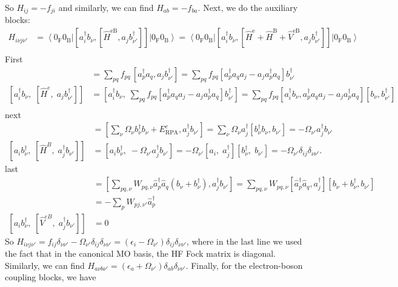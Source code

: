 So $H_{ij} = -f_{ji}$ and similarly, we can find $H_{ab} = -f_{ba}$. Next, we do the auxiliary blocks:
\begin{align}
H_{i \nu j \nu'} &= \left\langle 0_{\mathrm{F}} 0_{\mathrm{B}}\right|\left[a_i^{\dagger} b_\nu, \left[\hat{H}^{\mathrm{eB}}, a_j b_{\nu'}^{\dagger}\right]\right]\left|0_{\mathrm{F}} 0_{\mathrm{B}}\right\rangle = \left\langle 0_{\mathrm{F}} 0_{\mathrm{B}}\right|\left[a_i^{\dagger} b_\nu, \left[\hat{H}^{\mathrm{e}} + \hat{H}^{\mathrm{B}} + \hat{V}^{\mathrm{eB}}, a_j b_{\nu'}^{\dagger}\right]\right]\left|0_{\mathrm{F}} 0_{\mathrm{B}}\right\rangle \\
\end{align}
First
\begin{align}
[\hat H^e,\;a_j b_{\nu'}^{\dagger}] &= \sum_{p q}f_{pq}\,[a_p^\dagger a_q, a_j b_{\nu'}^{\dagger}] = \sum_{pq}f_{pq} [a_p^\dagger a_q a_j - a_j a_p^\dagger a_q] b_{\nu'}^{\dagger} \\
[a_i^\dagger b_\nu,\;[\hat H^e,\;a_j b_{\nu'}^{\dagger}]] &= [a_i^\dagger b_\nu,\; \sum_{pq}f_{pq} [a_p^\dagger a_q a_j - a_j a_p^\dagger a_q] b_{\nu'}^{\dagger}] = \sum_{pq}f_{pq} [a_i^\dagger b_\nu, a_p^\dagger a_q a_j - a_j a_p^\dagger a_q] [b_\nu, b_{\nu'}^{\dagger}] \\
\end{align}
next
\begin{align}
[\hat H^B,\;a_j^\dagger b_{\nu'}] &= [\sum_{\nu} \Omega_\nu {b}_\nu^{\dagger} {b}_\nu + E_{\mathrm{RPA}}^c, a_j^{\dagger} b_{\nu'}] = \sum_{\nu} \Omega_\nu a_j^{\dagger}[ {b}_\nu^{\dagger} {b}_\nu, b_{\nu'}] = - \Omega_{\nu'} a_j^{\dagger} {b}_{\nu'} \\
[a_i b_\nu^\dagger,\;[\hat H^B,\;a_j^\dagger b_{\nu'}]] &= [a_i b_\nu^\dagger,\;-\Omega_{\nu'} a_j^\dagger b_{\nu'}] = -\Omega_{\nu'} [a_i,\;a_j^\dagger] [b_\nu^\dagger,\;b_{\nu'}] = -\Omega_{\nu'} \delta_{ij} \delta_{\nu \nu'}.
\end{align}
last
\begin{align}
[\hat V^{eB},\;a_j^\dagger b_{\nu'}] &= [\sum_{p q, \nu} W_{p q, \nu} \hat{a}_p^{\dagger} \hat{a}_q \left({b}_\nu+{b}_\nu^{\dagger}\right), a_j^{\dagger} b_{\nu'}] = \sum_{p q, \nu} W_{p q, \nu} [\hat{a}_p^{\dagger} \hat{a}_q, a_j^{\dagger}] [{b}_\nu+{b}_\nu^{\dagger}, b_{\nu'}]\\
& = -\sum_{p} W_{p j, \nu'} \hat{a}_p^{\dagger} \\ [a_i b_\nu^\dagger,\;[\hat V^{eB},\;a_j^\dagger b_{\nu'}]] &= 0
\end{align}
So $H_{i\nu j \nu'} = f_{ij} \delta_{\nu \nu'} - \Omega_{\nu'} \delta_{ij} \delta_{\nu \nu'} = \left(\epsilon_i - \Omega_{\nu'}\right) \delta_{ij} \delta_{\nu \nu'}$, where in the last line we used the fact that in the canonical MO basis, the HF Fock matrix is diagonal. Similarly, we can find $H_{a \nu b \nu'} = \left(\epsilon_a + \Omega_{\nu'}\right) \delta_{ab} \delta_{\nu \nu'}$. Finally, for the electron-boson coupling blocks, we have
